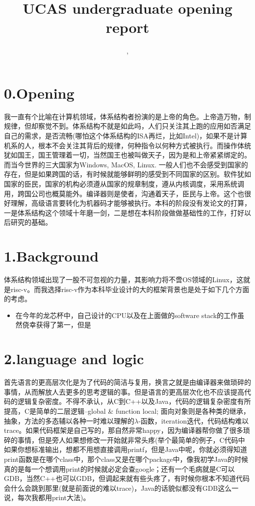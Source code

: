 \documentclass[11pt]{article}
\title{UCAS undergraduate opening report}
\author{\Name, \SID}
\date{}
\begin{document}
\maketitle
\section*{0.Opening}
我一直有个比喻在计算机领域，体系结构者扮演的是上帝的角色。上帝造万物，制规律，但却察觉不到。体系结构不就是如此吗，人们只关注其上跑的应用如否满足自己的需求，是否流畅(哪怕这个体系结构的ISA再烂，比如Intel)，如果不是计算机系的人，根本不会关注其背后的规律，何种指令以何种方式被执行。而操作体统犹如国王，国王管理着一切，当然国王也被叫做天子，因为是和上帝紧紧绑定的。而当今世界的三大国家为Windows, MacOS, Linux. 一般人们也不会感受到国家的存在，但是如果跨国的话，有时候就能够鲜明的感受到不同国家的区别。软件犹如国家的臣民，国家的机构必须遵从国家的规章制度，遵从内核调度，采用系统调用，跨国公司也概莫能外。编译器则是使者，沟通着天子，臣民与上帝。这个也很好理解，高级语言要转化为机器码才能够被执行。本科的阶段没有发论文的打算，一是体系结构这个领域十年磨一剑，二是想在本科阶段做做基础性的工作，打好以后研究的基础。

\section*{1.Background}
体系结构领域出现了一股不可忽视的力量，其影响力将不啻OS领域的Linux，这就是risc-v。而我选择risc-v作为本科毕业设计的大的框架背景也是处于如下几个方面的考虑。
\begin{itemize}
	\item 在今年的龙芯杯中，自己设计的CPU以及在上面做的software stack的工作虽然侥幸获得了第一，但是
\end{itemize}

\section*{2.language and logic}
首先语言的更高层次化是为了代码的简洁与复用，换言之就是由编译器来做琐碎的事情，从而解放人去更多的思考逻辑的事。但是语言的更高层次化也不应该提高代码的逻辑复杂密度。不得不承认，从C到C++以及Java，代码的逻辑复杂密度有所提高，C是简单的二层逻辑--global \& function local; 面向对象则是各种类的继承，抽象，方法的多态辅以各种一时难以理解的$ \lambda $-函数，iteration迭代，代码结构难以trace。如果代码框架是自己写的，那自然非常happy，因为编译器帮你做了很多琐碎的事情，但是旁人如果想修改一开始就非常头疼(举个最简单的例子，C代码中如果你想标准输出，想都不用想直接调用printf，但是Java中呢，你就必须得知道print函数是在哪个class中，那个class又是在哪个package中，像我初学Java的时候真的是每一个想调用print的时候就必定会查google；还有一个毛病就是C可以GDB，当然C++也可以GDB，但调起来就有些头疼了，有时候你根本不知道代码会什么会跳到那里(就是前面说的难以trace)，Java的话貌似都没有GDB这么一说，每次我都用print大法)。
\end{document}
